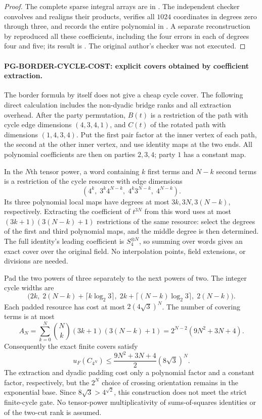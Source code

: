 \begin{proof}
The complete sparse integral arrays are in
.
The independent checker 
convolves and realigns their products, verifies all $1024$
coordinates in degrees zero through three, and records the entire
polynomial in .
A separate reconstruction by
 reproduced all these
coefficients, including the four errors in each of degrees four
and five; its result is .
The original author's checker was not executed.
\end{proof}

\paragraph{PG-BORDER-CYCLE-COST: explicit covers obtained by coefficient extraction.}
The border formula by itself does not give a cheap cycle cover.
The following direct calculation includes the non-dyadic bridge
ranks and all extraction overhead. After the party permutation,
$B(t)$ is a restriction of the path with cycle edge dimensions
$(4,3,4,1)$, and $C(t)$ of the rotated path with dimensions
$(1,4,3,4)$. Put the first pair factor at the inner vertex of each
path, the second at the other inner vertex, and use identity maps
at the two ends. All polynomial coefficients are then on parties
$2,3,4$; party $1$ has a constant map.

In the $N$th tensor power, a word containing $k$ first terms and
$N-k$ second terms is a restriction of the cycle resource with
edge dimensions
\[
 (4^k,\;3^k4^{N-k},\;4^k3^{N-k},\;4^{N-k}).
\]
Its three polynomial local maps have degrees at most
$3k,3N,3(N-k)$, respectively. Extracting the coefficient of
$t^{3N}$ from this word uses at most
$(3k+1)(3(N-k)+1)$ restrictions of the same resource: select
the degrees of the first and third polynomial maps, and the
middle degree is then determined. The full identity's leading
coefficient is $S_4^{\otimes N}$, so summing over words gives
an exact cover over the original field. No interpolation points,
field extensions, or divisions are needed.

Pad the two powers of three separately to the next powers of
two. The integer cycle widths are
\[
 \bigl(2k,\;2(N-k)+\lceil k\log_2 3\rceil,\;
 2k+\lceil(N-k)\log_2 3\rceil,\;2(N-k)\bigr).
\]
Each padded resource has cost at most
$2(4\sqrt3)^N$. The number of covering terms is at most
\[
 A_N=\sum_{k=0}^N\binom Nk(3k+1)(3(N-k)+1)
     =2^{N-2}(9N^2+3N+4).
\]
Consequently the exact finite covers satisfy
\[
 u_F(C_{4^N})\leq
 \frac{9N^2+3N+4}{2}(8\sqrt3)^N.
 \tag{PG-BORDER-cycle-cost}
\]
The extraction and dyadic padding cost only a polynomial factor
and a constant factor, respectively, but the $2^N$ choice of
crossing orientation remains in the exponential base.
Since $8\sqrt3>4^{\sqrt2}$, this construction does not meet the
strict finite-cycle gate. No tensor-power multiplicativity of
sums-of-squares identities or of the two-cut rank is assumed.


